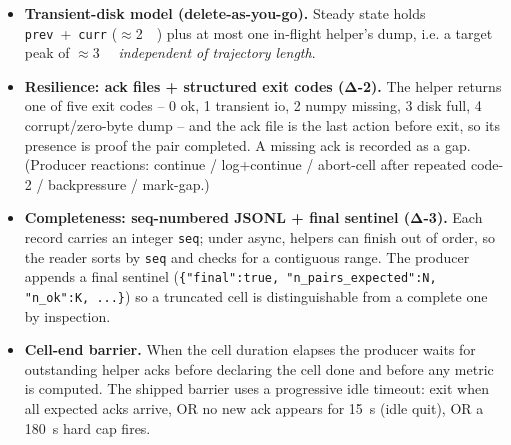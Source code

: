 \documentclass[conference]{IEEEtran}
\begin{document}
\begin{itemize}
        the helper's compute with the next cycle's snapshot work, dropping the
        effective per-cycle cost from $\approx$\SI{2.5}{\second} (sync) to
        $\approx$\SI{1.5}{\second} (async) as reported in the B+3.1 proposal.
  \item \textbf{Transient-disk model (delete-as-you-go).} Steady state holds
        \texttt{prev}~+~\texttt{curr} ($\approx$\SI{2}{\gibi\byte}) plus at most
        one in-flight helper's dump, i.e. a target peak of
        $\approx$\SI{3}{\gibi\byte} \emph{independent of trajectory length}.
  \item \textbf{Resilience: ack files + structured exit codes (Δ-2).} The
        helper returns one of five exit codes -- 0 ok, 1 transient io, 2 numpy
        missing, 3 disk full, 4 corrupt/zero-byte dump -- and the ack file is
        the last action before exit, so its presence is proof the pair
        completed. A missing ack is recorded as a gap. (Producer reactions:
        continue / log+continue / abort-cell after repeated code-2 / backpressure
        / mark-gap.)
  \item \textbf{Completeness: seq-numbered JSONL + final sentinel (Δ-3).} Each
        record carries an integer \texttt{seq}; under async, helpers can finish
        out of order, so the reader sorts by \texttt{seq} and checks for a
        contiguous range. The producer appends a final sentinel
        (\texttt{\{"final":true, "n\_pairs\_expected":N, "n\_ok":K, ...\}}) so a
        truncated cell is distinguishable from a complete one by inspection.
  \item \textbf{Cell-end barrier.} When the cell duration elapses the producer
        waits for outstanding helper acks before declaring the cell done and
        before any metric is computed. The shipped barrier uses a progressive
        idle timeout: exit when all expected acks arrive, OR no new ack appears
        for \SI{15}{\second} (idle quit), OR a \SI{180}{\second} hard cap fires.

\end{itemize}
\end{document}
